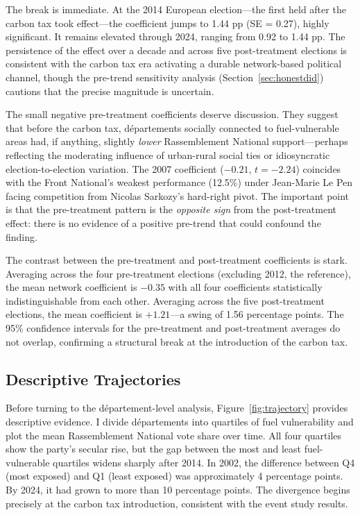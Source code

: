 \documentclass[12pt]{article}
\newcommand{\rn}{Rassemblement National}
\newcommand{\fn}{Front National}
\newcommand{\dept}{d\'{e}partement}
\newcommand{\depts}{d\'{e}partements}
\begin{document}
The break is immediate. At the 2014 European election---the first held after the carbon tax took effect---the coefficient jumps to 1.44 pp (SE = 0.27), highly significant. It remains elevated through 2024, ranging from 0.92 to 1.44 pp. The persistence of the effect over a decade and across five post-treatment elections is consistent with the carbon tax era activating a durable network-based political channel, though the pre-trend sensitivity analysis (Section~\ref{sec:honestdid}) cautions that the precise magnitude is uncertain.

The small negative pre-treatment coefficients deserve discussion. They suggest that before the carbon tax, \depts{} socially connected to fuel-vulnerable areas had, if anything, slightly \emph{lower} \rn{} support---perhaps reflecting the moderating influence of urban-rural social ties or idiosyncratic election-to-election variation. The 2007 coefficient ($-0.21$, $t = -2.24$) coincides with the \fn{}'s weakest performance (12.5\%) under Jean-Marie Le Pen facing competition from Nicolas Sarkozy's hard-right pivot. The important point is that the pre-treatment pattern is the \emph{opposite sign} from the post-treatment effect: there is no evidence of a positive pre-trend that could confound the finding.

The contrast between the pre-treatment and post-treatment coefficients is stark. Averaging across the four pre-treatment elections (excluding 2012, the reference), the mean network coefficient is $-0.35$ with all four coefficients statistically indistinguishable from each other. Averaging across the five post-treatment elections, the mean coefficient is $+1.21$---a swing of 1.56 percentage points. The 95\% confidence intervals for the pre-treatment and post-treatment averages do not overlap, confirming a structural break at the introduction of the carbon tax.

\subsection{Descriptive Trajectories}

Before turning to the \dept{}-level analysis, Figure~\ref{fig:trajectory} provides descriptive evidence. I divide \depts{} into quartiles of fuel vulnerability and plot the mean \rn{} vote share over time. All four quartiles show the party's secular rise, but the gap between the most and least fuel-vulnerable quartiles widens sharply after 2014. In 2002, the difference between Q4 (most exposed) and Q1 (least exposed) was approximately 4 percentage points. By 2024, it had grown to more than 10 percentage points. The divergence begins precisely at the carbon tax introduction, consistent with the event study results.
\end{document}
